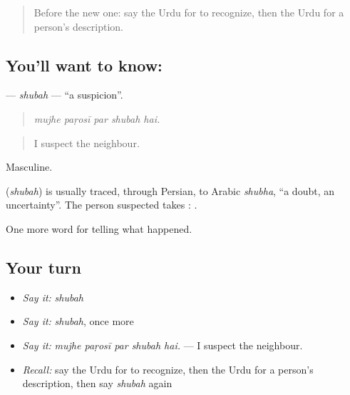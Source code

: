 \label{lesson:UR-C279-shubah}



\begin{quote}
Before the new one: say the Urdu for to recognize, then the Urdu for a person's description.
\end{quote}

\subsection*{You'll want to know: }
\textbf{} — \emph{shubah} — \textquotedblleft{}a suspicion\textquotedblright{}.

\begin{quote}
    
\end{quote}

\begin{quote}
\emph{mujhe paṛosī par shubah hai.}
\end{quote}

\begin{quote}
I suspect the neighbour.
\end{quote}

Masculine.

\begin{cousinweb}
\textbf{} (\emph{shubah}) is usually traced, through Persian, to Arabic \emph{shubha}, \textquotedblleft{}a doubt, an uncertainty\textquotedblright{}. The person suspected takes \textbf{}: \textbf{  }.
\end{cousinweb}

\begin{grammarlens}[title={What you've built}]
One more word for telling what happened.
\end{grammarlens}

\subsection*{Your turn}
\begin{itemize}
\raggedright
  \item \emph{Say it:} \emph{shubah}
  \item \emph{Say it:} \emph{shubah}, once more
  \item \emph{Say it:} \emph{mujhe paṛosī par shubah hai.} — I suspect the neighbour.
  \item \emph{Recall:} say the Urdu for to recognize, then the Urdu for a person's description, then say \emph{shubah} again
\end{itemize}

